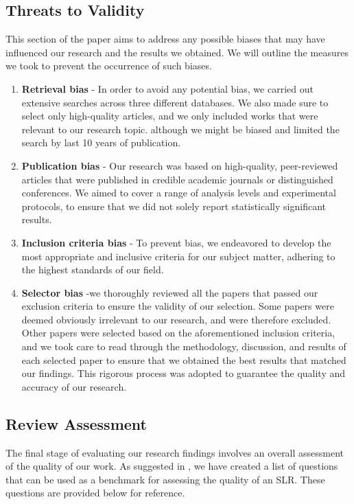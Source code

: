 \subsection{Threats to Validity}
This section of the paper aims to address any possible biases that may have influenced our research and the results we obtained. We will outline the measures we took to prevent the occurrence of such biases.\cite{A_NewParadigm_for_SystematicLiteratureReviews}

\begin{enumerate}
    \item \textbf{Retrieval bias} - In order to avoid any potential bias, we carried out extensive searches across three different databases. We also made sure to select only high-quality articles, and we only included works that were relevant to our research topic. although we might be biased and limited the search by last 10 years of publication.

    \item \textbf{Publication bias} - Our research was based on high-quality, peer-reviewed articles that were published in credible academic journals or distinguished conferences. We aimed to cover a range of analysis levels and experimental protocols, to ensure that we did not solely report statistically significant results.
    \item \textbf{Inclusion criteria bias} - To prevent bias, we endeavored to develop the most appropriate and inclusive criteria for our subject matter, adhering to the highest standards of our field.
    \item \textbf{Selector bias} -we thoroughly reviewed all the papers that passed our exclusion criteria to ensure the validity of our selection. Some papers were deemed obviously irrelevant to our research, and were therefore excluded. Other papers were selected based on the aforementioned inclusion criteria, and we took care to read through the methodology, discussion, and results of each selected paper to ensure that we obtained the best results that matched our findings. This rigorous process was adopted to guarantee the quality and accuracy of our research.
\end{enumerate}

\subsection{Review Assessment}
The final stage of evaluating our research findings involves an overall assessment of the quality of our work. As suggested in \cite{Procedures_for_PerformingSystematicReviews}, we have created a list of questions that can be used as a benchmark for assessing the quality of an SLR. These questions are provided below for reference.

